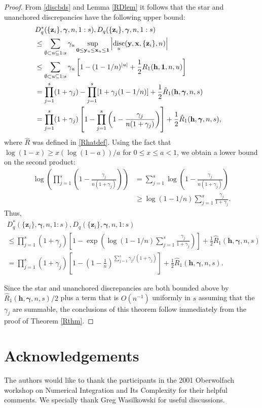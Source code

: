 \documentclass{article}
\renewcommand{\vec}[1]{\ensuremath{\mathbf{#1}}}
\newcommand{\vecsym}[1]{\ensuremath{\boldsymbol{#1}}}
\def\abs#1{\ensuremath{\left \lvert #1 \right \rvert}}
\DeclareMathOperator{\disc}{disc}
\newcommand{\bfgam}{\vecsym \gamma}
\newcommand{\one}{\vecsym 1}
\newcommand{\zero}{{\bf 0}}
\newcommand{\h}{\vec h}
\newcommand{\x}{\vec x}
\newcommand{\y}{\vec y}
\newcommand{\z}{\vec z}
\begin{document}
\begin{proof} From \eqref{discbds} and Lemma \ref{RDlem} it follows 
that the star and unanchored discrepancies have the following upper bound:
\begin{align*}
     \lefteqn{D^{*}_{q}(\{\z_{i}\},\bfgam,n,1:s),
     D_{q}(\{\z_{i}\},\bfgam,n,1:s) } \\
     & \le \sum_{\emptyset \subset u
    \subseteq 1:s} \gamma_{u} \sup_{\zero \le \y_{u} \le \x_{u} \le
    \one} \abs{ \disc_{u}(\y,\x, \{\z_{i}\},n)} \\
    & \le \sum_{\emptyset \subset u \subseteq 1:s} \gamma_{u}\left[1 -
    (1-1/n)^{\abs{u}} + \frac 12 R_{1}(\h,\one,n,u) \right] \\
    &= \prod_{j=1}^{s} (1 + 
    \gamma_{j}) - \prod_{j=1}^{s} [1 + 
    \gamma_{j}(1-1/n)]+ \frac 12 \hat{R}_{1}(\h,\bfgam,n,s) \\
   &= \prod_{j=1}^{s} (1 + \gamma_{j})\left [ 1 - \prod_{j=1}^{s}
   \left(1 - \frac {\gamma_{j}}{n(1+\gamma_{j})}\right) \right] +
   \frac 12 \hat{R}_{1}(\h,\bfgam,n,s),
\end{align*}
where $\hat{R}$ was defined in \eqref{Rhatdef}.  Using the fact that
$\log(1-x) \ge x (\log(1- a))/a$ for $0 \le x \le a < 1$, we obtain a
lower bound on the second product:
\begin{align*}
   \log \left(\prod_{j=1}^{s} \left(1 - \frac
   {\gamma_{j}}{n(1+\gamma_{j})}\right) \right) &= \sum_{j=1}^{s} \log
   \left(1 - \frac {\gamma_{j}}{n(1+\gamma_{j})}\right) \\
   &\ge \log(1-1/n) \sum_{j=1}^{s} \frac {
   \gamma_{j}}{1+\gamma_{j}}.
\end{align*}
Thus,
\begin{multline*}
     D^{*}_{q}(\{\z_{i}\},\bfgam,n,1:s),
     D_{q}(\{\z_{i}\},\bfgam,n,1:s) \\
\le  \prod_{j=1}^{s} (1 +
     \gamma_{j}) \left [1 - \exp\left( \log(1-1/n)
     \sum_{j=1}^{s} \frac { \gamma_{j}}{1+\gamma_{j}} \right) \right] +
     \frac 12 \hat{R}_{1}(\h,\bfgam,n,s) \\
     =  \prod_{j=1}^{s} (1 +
     \gamma_{j}) \left [1 - \left( 1- \frac 1n \right)
     ^{\sum_{j=1}^{s} \gamma_{j}/(1+\gamma_{j})} \right] +
     \frac 12 \hat{R}_{1}(\h,\bfgam,n,s).
\end{multline*}

Since the star and unanchored discrepancies are both bounded above by
$\hat{R}_{1}(\h,\bfgam,n,s)/2$ plus a term that is $O(n^{-1})$
uniformly in $s$ assuming that the $\gamma_{j}$ are summable, the
conclusions of this theorem follow immediately from the proof of
Theorem \ref{Rthm}.
\end{proof}

\section*{Acknowledgements} The authors would like to thank the
participants in the 2001 Oberwolfach workshop on Numerical Integration
and Its Complexity for their helpful comments.  We specially thank Greg
Wasilkowski for useful discussions.



\end{document}
